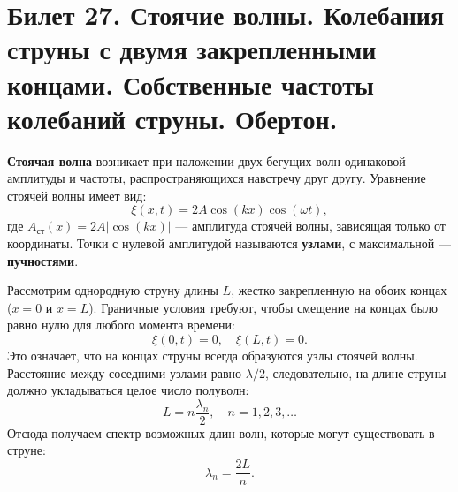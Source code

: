 \section{Билет 27. Стоячие волны. Колебания струны с двумя закрепленными концами. Собственные частоты колебаний струны. Обертон.}

\begin{definition}
\textbf{Стоячая волна} возникает при наложении двух бегущих волн одинаковой амплитуды и частоты, распространяющихся навстречу друг другу. Уравнение стоячей волны имеет вид:
\begin{equation}
    \xi(x,t) = 2A \cos(kx) \cos(\omega t),
\end{equation}
где $A_{\text{ст}}(x) = 2A|\cos(kx)|$ --- амплитуда стоячей волны, зависящая только от координаты. Точки с нулевой амплитудой называются \textbf{узлами}, с максимальной --- \textbf{пучностями}.
\end{definition}

\begin{theorem}
Рассмотрим однородную струну длины $L$, жестко закрепленную на обоих концах ($x=0$ и $x=L$). Граничные условия требуют, чтобы смещение на концах было равно нулю для любого момента времени:
\begin{equation}
    \xi(0,t) = 0, \quad \xi(L,t) = 0.
\end{equation}
Это означает, что на концах струны всегда образуются узлы стоячей волны. Расстояние между соседними узлами равно $\lambda/2$, следовательно, на длине струны должно укладываться целое число полуволн:
\begin{equation}
    L = n \frac{\lambda_n}{2}, \quad n = 1, 2, 3, \dots \label{eq:string_condition}
\end{equation}
Отсюда получаем спектр возможных длин волн, которые могут существовать в струне:
\begin{equation}
    \lambda_n = \frac{2L}{n}. \label{eq:wavelength_string}
\end{equation}
\end{theorem}

